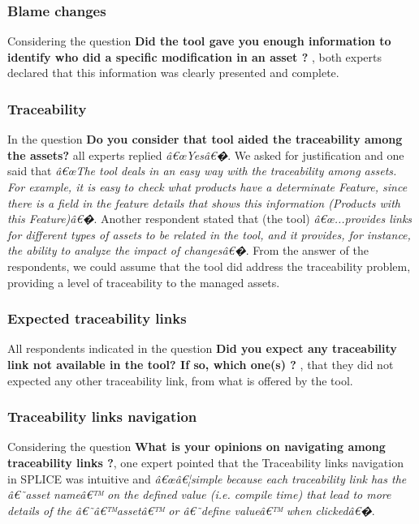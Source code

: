 \subsubsection{Blame changes}
Considering the question \textbf{ Did the tool gave you enough information to identify who did a specific modification in an asset ?} , both experts declared that this information was clearly presented and complete.

\subsubsection{Traceability}

In the question \textbf{Do you consider that tool aided the traceability among the assets?} all experts replied \textit{â€œYesâ€�}. We asked for justification and one said that \textit{â€œThe tool deals in an easy way with the traceability among assets. For example, it is easy to check what products have a determinate Feature, since there is a field in the feature details that shows this information (Products with this Feature)â€�}.
Another respondent stated that (the tool) \textit{â€œ...provides links for different types of assets to be related in the tool, and it provides, for instance, the ability to analyze the impact of changesâ€�}. From the answer of the respondents, we could assume that the tool did address the traceability problem, providing a level of traceability to the managed assets.


\subsubsection{Expected traceability links}
All respondents indicated in the question \textbf{Did you expect any traceability link not available in the tool? If so, which one(s) ?} , that they did not expected any other traceability link, from what is offered by the tool.

\subsubsection{Traceability links navigation}
Considering the question \textbf{ What is your opinions on navigating among traceability links ?}, one expert pointed that the Traceability links navigation in \ac{SPLICE} was intuitive and \textit{â€œâ€¦simple because each traceability link has the â€˜asset nameâ€™ on the defined value (i.e. compile time) that lead to more details of the â€˜â€™assetâ€™ or â€˜define valueâ€™ when clickedâ€�}. 

